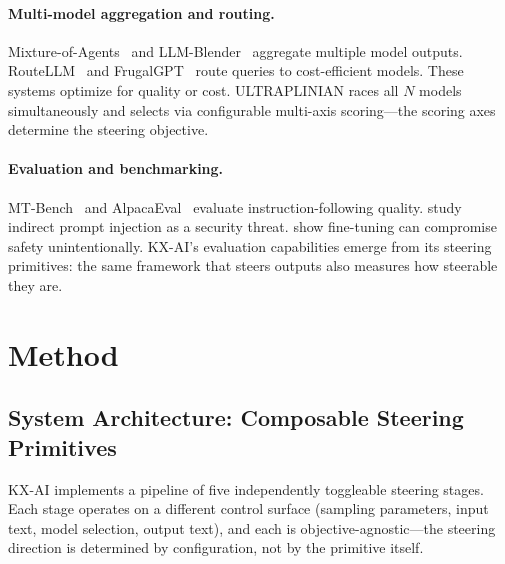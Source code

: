 \documentclass[11pt]{article}
\begin{document}
\paragraph{Multi-model aggregation and routing.}
Mixture-of-Agents~\cite{wang2024mixture} and LLM-Blender~\cite{jiang2023llmblender} aggregate multiple model outputs. RouteLLM~\cite{ong2024routellm} and FrugalGPT~\cite{chen2023frugalgpt} route queries to cost-efficient models. These systems optimize for quality or cost. ULTRAPLINIAN races all $N$ models simultaneously and selects via configurable multi-axis scoring---the scoring axes determine the steering objective.

\paragraph{Evaluation and benchmarking.}
MT-Bench~\cite{zheng2024judging} and AlpacaEval~\cite{li2023alpacaeval} evaluate instruction-following quality. \citet{greshake2023not} study indirect prompt injection as a security threat. \citet{qi2024finetuning} show fine-tuning can compromise safety unintentionally. KX-AI's evaluation capabilities emerge from its steering primitives: the same framework that steers outputs also measures how steerable they are.

\section{Method}
\label{sec:method}

\subsection{System Architecture: Composable Steering Primitives}

KX-AI implements a pipeline of five independently toggleable steering stages. Each stage operates on a different control surface (sampling parameters, input text, model selection, output text), and each is objective-agnostic---the steering direction is determined by configuration, not by the primitive itself.
\end{document}
